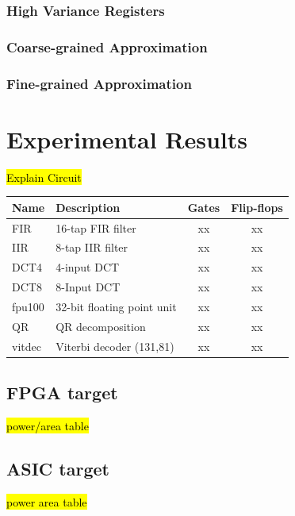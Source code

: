 \documentclass[conference]{IEEEtran}
\begin{document}
\subsubsection{High Variance Registers}
\subsubsection{Coarse-grained Approximation}
\subsubsection{Fine-grained Approximation}


















\section{Experimental Results}
\hl{Explain Circuit}\\
\begin{tabular} {| l | l | c | c |}
\hline
Name & Description & Gates & Flip-flops \\
\hline\hline
FIR & 16-tap FIR filter & xx & xx \\
IIR & 8-tap IIR filter & xx &xx \\
DCT4 & 4-input DCT & xx & xx \\
DCT8 & 8-Input DCT & xx & xx \\
fpu100 & 32-bit floating point unit & xx & xx \\
QR & QR decomposition & xx & xx \\
vitdec & Viterbi decoder (131,81) & xx & xx \\
\hline
\end{tabular}
\subsection{FPGA target}
\hl{power/area table}
\subsection{ASIC target}
\hl{power area table}
\end{document}
